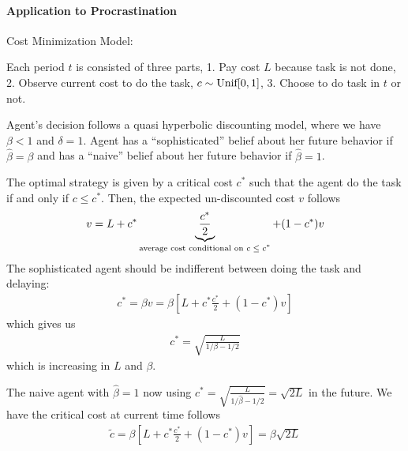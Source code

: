 \documentclass[11pt]{elegantbook}
\begin{document}
\paragraph*{Application to Procrastination}
Cost Minimization Model:

Each period $t$ is consisted of three parts, 1. Pay cost $L$ because task is not done, 2. Observe current cost to do the task, $c\sim \textnormal{Unif}[0,1]$, 3. Choose to do task in $t$ or not.

Agent's decision follows a quasi hyperbolic discounting model, where we have $\beta<1$ and $\delta=1$. Agent has a ``sophisticated'' belief about her future behavior if $\hat{\beta}=\beta$ and has a ``naive'' belief about her future behavior if $\hat{\beta}=1$.

The optimal strategy is given by a critical cost $c^*$ such that the agent do the task if and only if $c\leq c^*$. Then, the expected un-discounted cost $v$ follows
\begin{equation}
    \begin{aligned}
        v=L+c^*\underbrace{\frac{c^*}{2}}_\textnormal{average cost conditional on $c\leq c^*$}+(1-c^*)v
    \end{aligned}
    \nonumber
\end{equation}
The sophisticated agent should be indifferent between doing the task and delaying:
\begin{equation}
    \begin{aligned}
        c^*=\beta v = \beta[L+c^*\frac{c^*}{2}+(1-c^*)v]
    \end{aligned}
    \nonumber
\end{equation}
which gives us
\begin{equation}
    \begin{aligned}
        c^*=\sqrt{\frac{L}{1/\beta-1/2}}
    \end{aligned}
    \nonumber
\end{equation}
which is increasing in $L$ and $\beta$.

The naive agent with $\hat{\beta}=1$ now using $c^*=\sqrt{\frac{L}{1/\hat{\beta}-1/2}}=\sqrt{2L}$ in the future. We have the critical cost at current time follows
\begin{equation}
    \begin{aligned}
        \tilde{c}=\beta[L+c^*\frac{c^*}{2}+(1-c^*)v]=\beta\sqrt{2L}
    \end{aligned}
    \nonumber
\end{equation}
\end{document}
